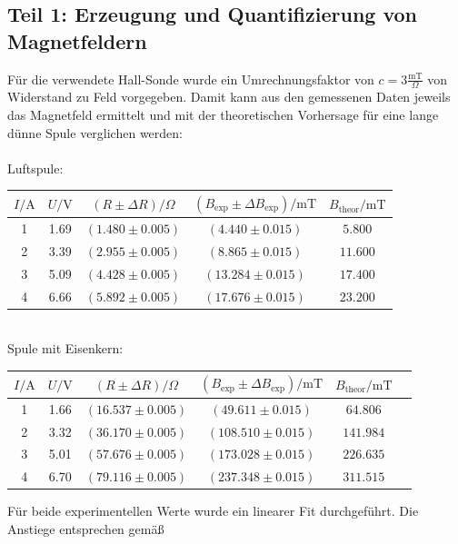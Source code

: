 \documentclass[german,  %
parskip=full,  %
]{scrartcl}
\begin{document}
\subsection{Teil 1: Erzeugung und Quantifizierung von Magnetfeldern}
Für die verwendete Hall-Sonde wurde ein Umrechnungsfaktor von \(c = 3 \frac{\mathrm{mT}}{\Omega}\) von Widerstand zu Feld vorgegeben. Damit kann aus den gemessenen Daten jeweils das Magnetfeld ermittelt und mit der theoretischen Vorhersage für eine lange dünne Spule verglichen werden: \\\\
Luftspule: 
\begin{table}[h!]
\begin{tabular}{|c|c|c|c|c|} 
\hline
\(I/ \mathrm{A}\) & \(U / \mathrm{V}\) & \((R \pm \Delta R )/ \Omega\) & \((B_{\mathrm{exp}} \pm \Delta B_{\mathrm{exp}}) / \mathrm{mT}\) & \(B_{\mathrm{theor}}  / \mathrm{mT}\)\\\hline
1 & 1.69 & \((1.480 \pm 0.005)\) & \((4.440 \pm 0.015)\) & \(5.800\)\\\hline
2 & 3.39 & \((2.955 \pm 0.005)\) & \((8.865 \pm 0.015)\) & \(11.600\)\\\hline
3 & 5.09 & \((4.428 \pm 0.005)\) & \((13.284 \pm 0.015)\) & \(17.400\) \\\hline
4 & 6.66 & \((5.892 \pm 0.005)\) & \((17.676 \pm 0.015)\) & \(23.200\)\\\hline
\end{tabular}
\end{table} \\
Spule mit Eisenkern:
\begin{table}[h!]
\begin{tabular}{|c|c|c|c|c|c|} 
\hline
\(I/ \mathrm{A}\) & \(U / \mathrm{V}\) & \((R \pm \Delta R )/ \Omega\) & \((B_{\mathrm{exp}} \pm \Delta B_{\mathrm{exp}}) / \mathrm{mT}\)  & \(B_{\mathrm{theor}}  / \mathrm{mT}\) \\\hline
1 & 1.66 & \((16.537 \pm 0.005)\) & \((49.611 \pm 0.015)\)  & \(64.806\)\\\hline
2 & 3.32 & \((36.170 \pm 0.005)\) & \((108.510 \pm 0.015)\) & \(141.984\) \\\hline
3 & 5.01 & \((57.676 \pm 0.005)\) & \((173.028 \pm 0.015)\) & \(226.635\)\\\hline
4 & 6.70 & \((79.116 \pm 0.005)\) & \((237.348 \pm 0.015)\) & \(311.515\)\\\hline
\end{tabular}
\end{table} 
Für beide experimentellen Werte wurde ein linearer Fit durchgeführt. Die Anstiege entsprechen gemäß
\end{document}

